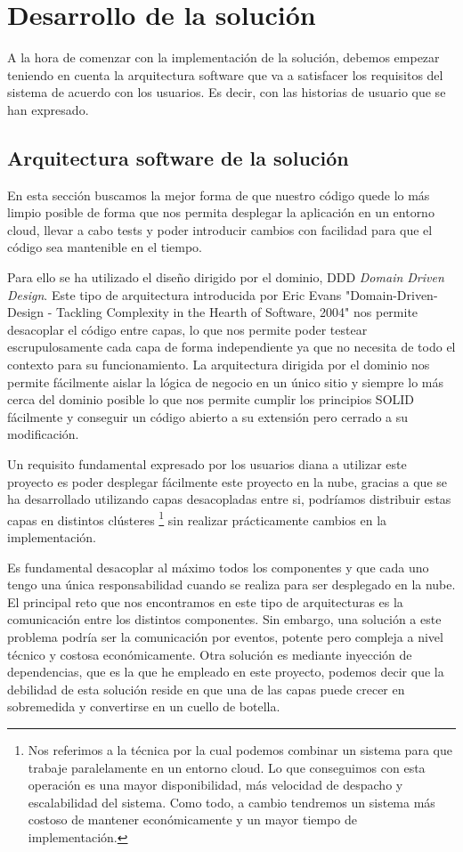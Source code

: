 \chapter{Desarrollo de la solución}
A la hora de comenzar con la implementación de la solución, debemos empezar teniendo en
cuenta la arquitectura software que va a satisfacer los requisitos del sistema de acuerdo con los
usuarios. Es decir, con las historias de usuario que se han expresado.

\section{Arquitectura software de la solución}
En esta sección buscamos la mejor forma de que nuestro código quede lo más limpio posible
de forma que nos permita desplegar la aplicación en un entorno cloud, llevar a cabo tests
y poder introducir cambios con facilidad para que el código sea mantenible en el tiempo.

Para ello se ha utilizado el diseño dirigido por el dominio, DDD \textit{Domain Driven
Design}. Este tipo de arquitectura introducida por Eric Evans \cite{ddd_book}
"Domain-Driven-Design - Tackling Complexity in the Hearth of Software, 2004" nos permite
desacoplar el código entre capas, lo que nos permite poder testear escrupulosamente cada
capa de forma independiente ya que no necesita de todo el contexto para su funcionamiento.
La arquitectura dirigida por el dominio nos permite fácilmente aislar la lógica de negocio
en un único sitio y siempre lo más cerca del dominio posible lo que nos permite cumplir
los principios \Gls{SOLID} fácilmente y conseguir un código abierto a su extensión pero
cerrado a su modificación.  


Un requisito fundamental expresado por los usuarios diana a utilizar este proyecto es
poder desplegar fácilmente este proyecto en la nube, gracias a que se ha desarrollado
utilizando capas desacopladas entre si, podríamos distribuir estas capas en distintos
clústeres \footnote{Nos referimos a la técnica por la cual podemos combinar un sistema
para que trabaje paralelamente en un entorno cloud. Lo que conseguimos con esta operación
es una mayor disponibilidad, más velocidad de despacho y escalabilidad del sistema. Como
todo, a cambio tendremos un sistema más costoso de mantener económicamente y un mayor
tiempo de implementación. } sin realizar prácticamente cambios en la implementación.  

Es fundamental desacoplar al máximo todos los componentes y que cada uno tengo una única
responsabilidad cuando se realiza para ser desplegado en la nube. El principal reto que nos
encontramos en este tipo de arquitecturas es la comunicación entre los distintos
componentes.  Sin embargo, una solución a este problema podría ser la comunicación por
eventos, potente pero compleja a nivel técnico y costosa económicamente. Otra solución es
mediante inyección de dependencias, que es la que he empleado en este proyecto, podemos
decir que la debilidad de esta solución reside en que una de las capas puede crecer en
sobremedida y convertirse en un cuello de botella.

